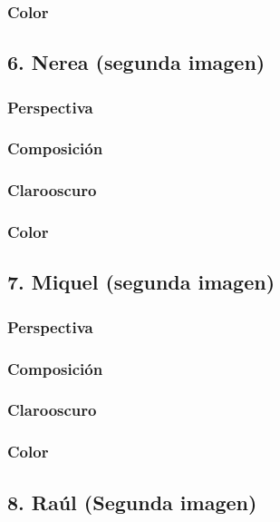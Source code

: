 \documentclass[12pt]{article}
\begin{document}
        \subsubsection{Color}
    \subsection{6. Nerea (segunda imagen)}
        \subsubsection{Perspectiva}
    
        \subsubsection{Composición}
    
        \subsubsection{Clarooscuro}
    
        \subsubsection{Color}
    \subsection{7. Miquel (segunda imagen)}
        \subsubsection{Perspectiva}
    
        \subsubsection{Composición}
    
        \subsubsection{Clarooscuro}
    
        \subsubsection{Color}
    \subsection{8. Raúl (Segunda imagen)}
\end{document}
